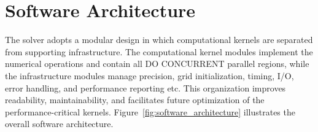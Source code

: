 \documentclass[11pt,a4paper]{article}
\begin{document}
	\section{Software Architecture}
	\label{sec:architecture}
	The solver adopts a modular design in which computational kernels are separated from supporting infrastructure. The computational kernel modules implement the numerical operations and contain all DO CONCURRENT parallel regions, while the infrastructure modules manage precision, grid initialization, timing, I/O, error handling, and performance reporting etc. This organization improves readability, maintainability, and facilitates future optimization of the performance-critical kernels.	
	Figure~\ref{fig:software_architecture} illustrates the overall software architecture.
	
\begin{figure}[ht]
	\centering
	
\end{figure}
\end{document}
